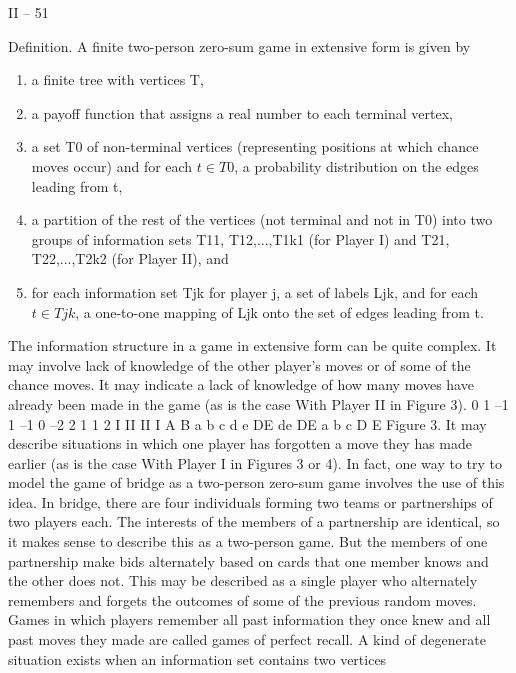\documentclass[]{report}
\begin{document}
II – 51
\begin{framed}
Definition. A finite two-person zero-sum game in extensive form is given by
\begin{enumerate}
\item a finite tree with vertices T,
\item a payoff function that assigns a real number to each terminal vertex,
\item a set T0 of non-terminal vertices (representing positions at which chance moves
occur) and for each $t \in T0$, a probability distribution on the edges leading from t,
\item a partition of the rest of the vertices (not terminal and not in T0) into two groups
of information sets T11, T12,...,T1k1 (for Player I) and T21, T22,...,T2k2 (for Player II),
and
\item for each information set Tjk for player j, a set of labels Ljk, and for each $t \in Tjk$,
a one-to-one mapping of Ljk onto the set of edges leading from t.
\end{enumerate}
\end{framed}
The information structure in a game in extensive form can be quite complex. It may
involve lack of knowledge of the other player’s moves or of some of the chance moves. It
may indicate a lack of knowledge of how many moves have already been made in the game
(as is the case With Player II in Figure 3).
0
1 –1 1 –1 0 –2 2 1
1 2
I
II II
I
A B
a b c d
e
DE de DE a b c
D E
Figure 3.
It may describe situations in which one player has forgotten a move they has made
earlier (as is the case With Player I in Figures 3 or 4). In fact, one way to try to model
the game of bridge as a two-person zero-sum game involves the use of this idea. In bridge,
there are four individuals forming two teams or partnerships of two players each. The
interests of the members of a partnership are identical, so it makes sense to describe this
as a two-person game. But the members of one partnership make bids alternately based
on cards that one member knows and the other does not. This may be described as a
single player who alternately remembers and forgets the outcomes of some of the previous
random moves. Games in which players remember all past information they once knew
and all past moves they made are called games of perfect recall.
A kind of degenerate situation exists when an information set contains two vertices
\end{document}
